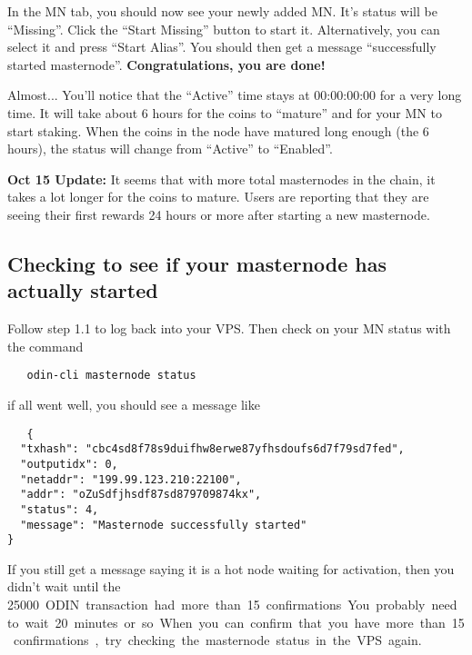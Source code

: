 \documentclass[rmp,12pt,notitlepage]{revtex4-1}
\begin{document}
In the MN tab, you should now see your newly added MN.  It's status will be ``Missing''.  Click the ``Start Missing'' button to start it.  Alternatively, you can select it and press ``Start Alias''.  You should then get a message ``successfully started masternode''.  \textbf{Congratulations, you are done!}  

Almost...
You'll notice that the ``Active'' time stays at 00:00:00:00 for a very long time.  It will take about 6 hours for the coins to ``mature'' and for your MN to start staking.  When the coins in the node have matured long enough (the 6 hours), the status will change from ``Active'' to ``Enabled''.

\textbf{Oct 15 Update:} It seems that with more total masternodes in the chain, it takes a lot longer for the coins to mature.  Users are reporting that they are seeing their first rewards 24 hours or more after starting a new masternode.

\subsection{Checking to see if your masternode has actually started}
Follow step 1.1 to log back into your VPS.  Then check on your MN status with the command
\begin{verbatim}
   odin-cli masternode status
\end{verbatim}
if all went well, you should see a message like
\begin{verbatim}
   {
  "txhash": "cbc4sd8f78s9duifhw8erwe87yfhsdoufs6d7f79sd7fed",
  "outputidx": 0,
  "netaddr": "199.99.123.210:22100",
  "addr": "oZuSdfjhsdf87sd879709874kx",
  "status": 4,
  "message": "Masternode successfully started"
}
\end{verbatim}
If you still get a message saying it is a hot node waiting for activation, then you didn't wait until the \SI{25000} ODIN transaction had more than 15 confirmations.  You probably need to wait 20 minutes or so.  When you can confirm that you have more than 15 confirmations, try checking the masternode status in the VPS again.   
\end{document}
